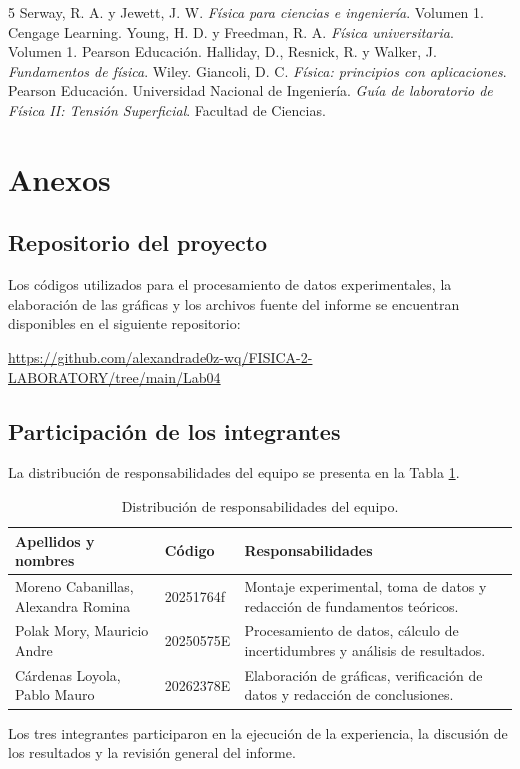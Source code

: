 \documentclass[11pt,a4paper]{article}
\begin{document}
\newpage
{}

\begin{thebibliography}{5}
     Serway, R. A. y Jewett, J. W. \textit{Física para ciencias e ingeniería}. Volumen 1. Cengage Learning.
     Young, H. D. y Freedman, R. A. \textit{Física universitaria}. Volumen 1. Pearson Educación.
     Halliday, D., Resnick, R. y Walker, J. \textit{Fundamentos de física}. Wiley.
     Giancoli, D. C. \textit{Física: principios con aplicaciones}. Pearson Educación.
     Universidad Nacional de Ingeniería. \textit{Guía de laboratorio de Física II: Tensión Superficial}. Facultad de Ciencias.
\end{thebibliography}

\newpage
\section{Anexos}

\subsection{Repositorio del proyecto}

Los códigos utilizados para el procesamiento de datos experimentales, la elaboración de las gráficas y los archivos fuente del informe se encuentran disponibles en el siguiente repositorio:

\url{https://github.com/alexandrade0z-wq/FISICA-2-LABORATORY/tree/main/Lab04}

\subsection{Participación de los integrantes}

La distribución de responsabilidades del equipo se presenta en la Tabla \ref{tab:participacion}.

\begin{table}[H]
    \centering
    \label{tab:participacion}
    \begin{tabular}{|l|l|p{7cm}|}
        \hline
        \textbf{Apellidos y nombres} & \textbf{Código} & \textbf{Responsabilidades} \\ \hline
        Moreno Cabanillas, Alexandra Romina & 20251764f & Montaje experimental, toma de datos y redacción de fundamentos teóricos. \\ \hline
        Polak Mory, Mauricio Andre & 20250575E & Procesamiento de datos, cálculo de incertidumbres y análisis de resultados. \\ \hline
        Cárdenas Loyola, Pablo Mauro & 20262378E & Elaboración de gráficas, verificación de datos y redacción de conclusiones. \\ \hline
    \end{tabular}
    \caption{Distribución de responsabilidades del equipo.}

\end{table}

Los tres integrantes participaron en la ejecución de la experiencia, la discusión de los resultados y la revisión general del informe.
\end{document}
